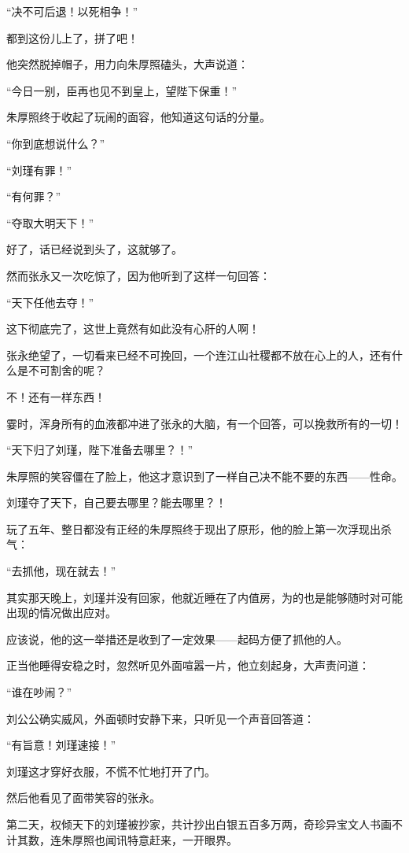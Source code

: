 \begin{multicols}{\theparacolNo}
		“决不可后退！以死相争！”

		都到这份儿上了，拼了吧！

		他突然脱掉帽子，用力向朱厚照磕头，大声说道：

		“今日一别，臣再也见不到皇上，望陛下保重！”

		朱厚照终于收起了玩闹的面容，他知道这句话的分量。

		“你到底想说什么？”

		“刘瑾有罪！”

		“有何罪？”

		“夺取大明天下！”

		好了，话已经说到头了，这就够了。

		然而张永又一次吃惊了，因为他听到了这样一句回答：

		“天下任他去夺！”

		这下彻底完了，这世上竟然有如此没有心肝的人啊！

		张永绝望了，一切看来已经不可挽回，一个连江山社稷都不放在心上的人，还有什么是不可割舍的呢？

		不！还有一样东西！

		霎时，浑身所有的血液都冲进了张永的大脑，有一个回答，可以挽救所有的一切！

		“天下归了刘瑾，陛下准备去哪里？！”

		朱厚照的笑容僵在了脸上，他这才意识到了一样自己决不能不要的东西——性命。

		刘瑾夺了天下，自己要去哪里？能去哪里？！

		玩了五年、整日都没有正经的朱厚照终于现出了原形，他的脸上第一次浮现出杀气：

		“去抓他，现在就去！”

		其实那天晚上，刘瑾并没有回家，他就近睡在了内值房，为的也是能够随时对可能出现的情况做出应对。

		应该说，他的这一举措还是收到了一定效果——起码方便了抓他的人。

		正当他睡得安稳之时，忽然听见外面喧嚣一片，他立刻起身，大声责问道：

		“谁在吵闹？”

		刘公公确实威风，外面顿时安静下来，只听见一个声音回答道：

		“有旨意！刘瑾速接！”

		刘瑾这才穿好衣服，不慌不忙地打开了门。

		然后他看见了面带笑容的张永。

		第二天，权倾天下的刘瑾被抄家，共计抄出白银五百多万两，奇珍异宝文人书画不计其数，连朱厚照也闻讯特意赶来，一开眼界。


\end{multicols}
